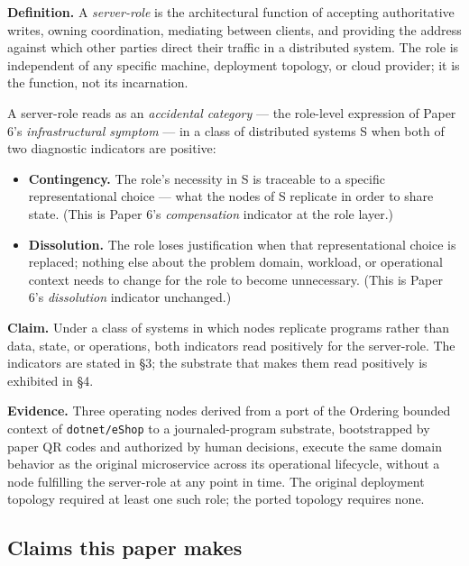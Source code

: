 \documentclass[
]{article}
\newcounter{none} %
\providecommand{\tightlist}{%
  \setlength{\itemsep}{0pt}\setlength{\parskip}{0pt}}
\begin{document}
\textbf{Definition.} A \emph{server-role} is the architectural function
of accepting authoritative writes, owning coordination, mediating
between clients, and providing the address against which other parties
direct their traffic in a distributed system. The role is independent of
any specific machine, deployment topology, or cloud provider; it is the
function, not its incarnation.

A server-role reads as an \emph{accidental category} --- the role-level
expression of Paper 6's \emph{infrastructural symptom} --- in a class of
distributed systems S when both of two diagnostic indicators are
positive:

\begin{itemize}
\tightlist
\item
  \textbf{Contingency.} The role's necessity in S is traceable to a
  specific representational choice --- what the nodes of S replicate in
  order to share state. (This is Paper 6's \emph{compensation} indicator
  at the role layer.)
\item
  \textbf{Dissolution.} The role loses justification when that
  representational choice is replaced; nothing else about the problem
  domain, workload, or operational context needs to change for the role
  to become unnecessary. (This is Paper 6's \emph{dissolution} indicator
  unchanged.)
\end{itemize}

\textbf{Claim.} Under a class of systems in which nodes replicate
programs rather than data, state, or operations, both indicators read
positively for the server-role. The indicators are stated in §3; the
substrate that makes them read positively is exhibited in §4.

\textbf{Evidence.} Three operating nodes derived from a port of the
Ordering bounded context of \texttt{dotnet/eShop} to a journaled-program
substrate, bootstrapped by paper QR codes and authorized by human
decisions, execute the same domain behavior as the original microservice
across its operational lifecycle, without a node fulfilling the
server-role at any point in time. The original deployment topology
required at least one such role; the ported topology requires none.

\subsection{Claims this paper makes}\label{claims-this-paper-makes}
\end{document}
